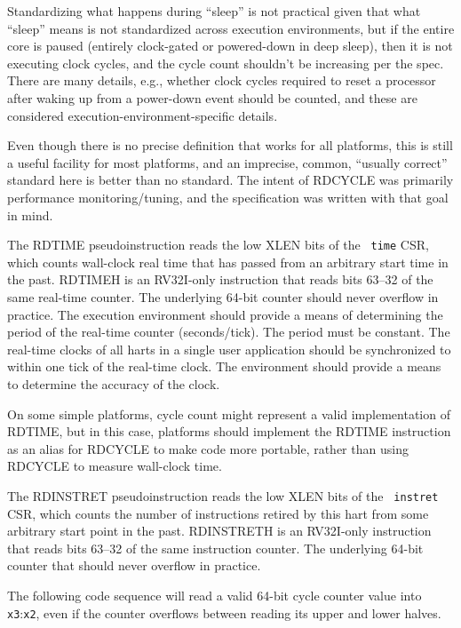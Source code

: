 \begin{commentary}
Standardizing what happens during ``sleep'' is not practical given
that what ``sleep'' means is not standardized across execution
environments, but if the entire core is paused (entirely clock-gated
or powered-down in deep sleep), then it is not executing clock cycles,
and the cycle count shouldn't be increasing per the spec.  There are
many details, e.g., whether clock cycles required to reset a processor
after waking up from a power-down event should be counted, and these
are considered execution-environment-specific details.

Even though there is no precise definition that works for all
platforms, this is still a useful facility for most platforms, and an
imprecise, common, ``usually correct'' standard here is better than no
standard.  The intent of RDCYCLE was primarily performance
monitoring/tuning, and the specification was written with that goal in
mind.
\end{commentary}

The RDTIME pseudoinstruction reads the low XLEN bits of the {\tt
  time} CSR, which counts wall-clock real time that has passed from an
arbitrary start time in the past.  RDTIMEH is an RV32I-only instruction
that reads bits 63--32 of the same real-time counter.  The underlying 64-bit
counter should never overflow in practice.  The execution environment
should provide a means of determining the period of the real-time
counter (seconds/tick).  The period must be constant.  The
real-time clocks of all harts in a single user application
should be synchronized to within one tick of the real-time clock.  The
environment should provide a means to determine the accuracy of the
clock.

\begin{commentary}
On some simple platforms, cycle count might represent a valid
implementation of RDTIME, but in this case, platforms should implement
the RDTIME instruction as an alias for RDCYCLE to make code more
portable, rather than using RDCYCLE to measure wall-clock time.
\end{commentary}

The RDINSTRET pseudoinstruction reads the low XLEN bits of the {\tt
  instret} CSR, which counts the number of instructions retired by
this hart from some arbitrary start point in the past.  RDINSTRETH is
an RV32I-only instruction that reads bits 63--32 of the same
instruction counter. The underlying 64-bit counter that should never
overflow in practice.

The following code sequence will read a valid 64-bit cycle counter value into
{\tt x3}:{\tt x2}, even if the counter overflows between reading its upper
and lower halves.

